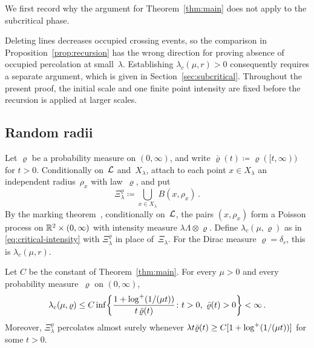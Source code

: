 \documentclass[11pt,letterpaper]{article}
\begin{document}
We first record why the argument for Theorem~\ref{thm:main} does not apply to the subcritical phase.

\begin{remark}
\label{rem:monotonicity}
Deleting lines decreases occupied crossing events, so the comparison in Proposition~\ref{prop:recursion} has the wrong direction for proving absence of occupied percolation at small~$\lambda$. Establishing $\lambda_c(\mu,r)>0$ consequently requires a separate argument, which is given in Section~\ref{sec:subcritical}. Throughout the present proof, the initial scale and one finite point intensity are fixed before the recursion is applied at larger scales.
\end{remark}

\subsection{Random radii}
\label{sec:random-radii}

Let $\varrho$ be a probability measure on $(0,\infty)$, and write $\bar\varrho(t)\coloneqq\varrho([t,\infty))$ for $t>0$. Conditionally on~$\mathcal L$ and~$X_\lambda$, attach to each point $x\in X_\lambda$ an independent radius~$\rho_x$ with law~$\varrho$, and put
\begin{equation*}
  \Xi_\lambda^\varrho\coloneqq\bigcup_{x\in X_\lambda}B(x,\rho_x)\,.
\end{equation*}
By the marking theorem~\cite[Theorem~5.6]{LP17}, conditionally on~$\mathcal L$, the pairs $(x,\rho_x)$ form a Poisson process on $\mathbb R^2\times(0,\infty)$ with intensity measure $\lambda\Lambda\otimes\varrho$. Define $\lambda_c(\mu,\varrho)$ as in \eqref{eq:critical-intensity} with $\Xi_\lambda^\varrho$ in place of~$\Xi_\lambda$. For the Dirac measure $\varrho=\delta_r$, this is $\lambda_c(\mu,r)$.

\begin{corollary}
\label{cor:random-radii}
Let $C$ be the constant of Theorem~\ref{thm:main}. For every $\mu>0$ and every probability measure~$\varrho$ on $(0,\infty)$,
\begin{equation}\label{eq:random-radii}
  \lambda_c(\mu,\varrho)\le C\inf\biggl\{\frac{1+\logp(1/(\mu t))}{t\,\bar\varrho(t)}\colon t>0,\ \bar\varrho(t)>0\biggr\}<\infty\,.
\end{equation}
Moreover, $\Xi_\lambda^\varrho$ percolates almost surely whenever $\lambda t\bar\varrho(t)\ge C[1+\log^{+}(1/(\mu t))]$ for some $t>0$.
\end{corollary}
\end{document}
